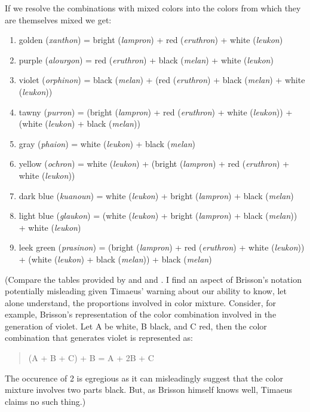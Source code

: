 If we resolve the combinations with mixed colors into the colors from which they are themselves mixed we get:
\begin{enumerate}[(1)]
	\item golden (\emph{xanthon}) = bright (\emph{lampron}) + red (\emph{eruthron}) + white (\emph{leukon})
	\item purple (\emph{alourgon}) = red (\emph{eruthron}) + black (\emph{melan}) + white (\emph{leukon})
	\item violet (\emph{orphinon}) = black (\emph{melan}) + (red (\emph{eruthron}) + black (\emph{melan}) + white (\emph{leukon}))
	\item tawny (\emph{purron}) = (bright (\emph{lampron}) + red (\emph{eruthron}) + white (\emph{leukon})) + (white (\emph{leukon}) + black (\emph{melan}))
	\item gray (\emph{phaion}) = white (\emph{leukon}) + black (\emph{melan})
	\item yellow (\emph{ochron}) = white (\emph{leukon}) + (bright (\emph{lampron}) + red (\emph{eruthron}) + white (\emph{leukon}))
	\item dark blue (\emph{kuanoun}) = white (\emph{leukon}) + bright (\emph{lampron}) + black (\emph{melan})
	\item light blue (\emph{glaukon}) = (white (\emph{leukon}) + bright (\emph{lampron}) + black (\emph{melan})) + white (\emph{leukon})
	\item leek green (\emph{prasinon}) = (bright (\emph{lampron}) + red (\emph{eruthron}) + white (\emph{leukon})) + (white (\emph{leukon}) + black (\emph{melan})) + black (\emph{melan})
\end{enumerate}
(Compare the tables provided by \citealt[56-7]{James:1996pb} and \citealt[175]{Brisson:1997qr} and \citealt[466-7, 600]{Brisson:1998aa}. I find an aspect of Brisson's notation potentially misleading given Tim\-ae\-us' warning about our ability to know, let alone understand, the proportions involved in color mixture. Consider, for example, Brisson's representation of the color combination involved in the generation of violet. Let A be white, B black, and C red, then the color combination that generates violet is represented as:
\begin{quote}
	(A + B + C) + B = A + 2B + C
\end{quote}
The occurence of 2 is egregious as it can misleadingly suggest that the color mixture involves two parts black. But, as Brisson himself knows well, Timaeus claims no such thing.)

